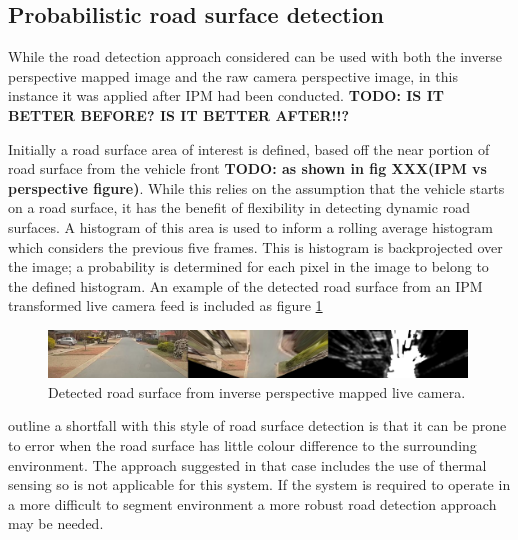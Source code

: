 \documentclass[]{aiaa-tc}%
\begin{document}
\subsection{Probabilistic road surface detection}

While the road detection approach considered can be used with both the inverse perspective mapped image and the raw camera perspective image, in this instance it was applied after IPM had been conducted. \textbf{TODO: IS IT BETTER BEFORE? IS IT BETTER AFTER!!?}

Initially a road surface area of interest is defined, based off the near portion of road surface from the vehicle front \textbf{TODO: as shown in fig XXX(IPM vs perspective figure)}. While this relies on the assumption that the vehicle starts on a road surface, it has the benefit of flexibility in detecting dynamic road surfaces. A histogram of this area is used to inform a rolling average histogram which considers the previous five frames. This is histogram is backprojected over the image; a probability is determined for each pixel in the image to belong to the defined histogram. An example of the detected road surface from an IPM transformed live camera feed is included as figure \ref{f:histRoadLive}


\begin{figure}
	\includegraphics[width=0.99\textwidth]{RoadDetection/histRoadLive.png}
	\caption{Detected road surface from inverse perspective mapped live camera.}
	\label{f:histRoadLive}
\end{figure}

\citet{histBackRefineShadows} outline a shortfall with this style of road surface detection is that it can be prone to error when the road surface has little colour difference to the surrounding environment. The approach suggested in that case includes the use of thermal sensing so is not applicable for this system. If the system is required to operate in a more difficult to segment environment a more robust road detection approach may be needed. 
\end{document}
